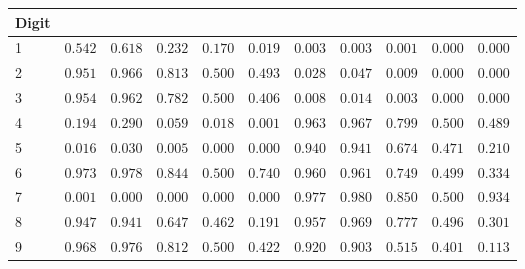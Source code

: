 \begin{table}[!tbp]
\begin{center}
\begin{tabular}{lrrrrrrrrrr}
\hline\hline
\multicolumn{1}{l}{Digit}&\multicolumn{1}{c}{}&\multicolumn{1}{c}{}&\multicolumn{1}{c}{}&\multicolumn{1}{c}{}&\multicolumn{1}{c}{}&\multicolumn{1}{c}{}&\multicolumn{1}{c}{}&\multicolumn{1}{c}{}&\multicolumn{1}{c}{}&\multicolumn{1}{c}{}\tabularnewline
\hline
1&$0.542$&$0.618$&$0.232$&$0.170$&$0.019$&$0.003$&$0.003$&$0.001$&$0.000$&$0.000$\tabularnewline
2&$0.951$&$0.966$&$0.813$&$0.500$&$0.493$&$0.028$&$0.047$&$0.009$&$0.000$&$0.000$\tabularnewline
3&$0.954$&$0.962$&$0.782$&$0.500$&$0.406$&$0.008$&$0.014$&$0.003$&$0.000$&$0.000$\tabularnewline
4&$0.194$&$0.290$&$0.059$&$0.018$&$0.001$&$0.963$&$0.967$&$0.799$&$0.500$&$0.489$\tabularnewline
5&$0.016$&$0.030$&$0.005$&$0.000$&$0.000$&$0.940$&$0.941$&$0.674$&$0.471$&$0.210$\tabularnewline
6&$0.973$&$0.978$&$0.844$&$0.500$&$0.740$&$0.960$&$0.961$&$0.749$&$0.499$&$0.334$\tabularnewline
7&$0.001$&$0.000$&$0.000$&$0.000$&$0.000$&$0.977$&$0.980$&$0.850$&$0.500$&$0.934$\tabularnewline
8&$0.947$&$0.941$&$0.647$&$0.462$&$0.191$&$0.957$&$0.969$&$0.777$&$0.496$&$0.301$\tabularnewline
9&$0.968$&$0.976$&$0.812$&$0.500$&$0.422$&$0.920$&$0.903$&$0.515$&$0.401$&$0.113$\tabularnewline
\hline
\end{tabular}\end{center}
\end{table}
